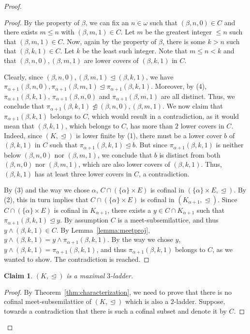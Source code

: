 \documentclass[]{amsart}
\newtheorem{claim}{Claim}[theorem]
\theoremstyle{definition}
\theoremstyle{remark}
\begin{document}
\begin{proof}
\begin{proof}
By the property of $\beta$, we can fix an $n\in\omega$ such that $(\beta, n, 0) \in C$ and there exists $m \le n$ with $(\beta, m, 1) \in C$. Let $m$ be the greatest integer $\le n$ such that $(\beta, m, 1) \in C$. Now, again by the property of $\beta$, there is some $k > n$ such that $(\beta, k, 1) \in C$. Let $k$ be the least such integer. Note that $m \le n < k$ and that $(\beta, n, 0), (\beta, m, 1)$ are lower covers of $(\beta, k, 1)$ in $C$. 

Clearly, since $(\beta, n, 0), (\beta, m, 1) \trianglelefteq (\beta, k, 1)$, we have $\pi_{\alpha+1} (\beta, n, 0), \pi_{\alpha+1} (\beta, m, 1) \trianglelefteq \pi_{\alpha+1} (\beta, k, 1)$. Moreover, by (4), $\pi_{\alpha+1} (\beta, k, 1)$, $\pi_{\alpha+1} (\beta, n, 0)$ and $\pi_{\alpha+1} (\beta, m, 1)$ are all distinct. Thus, we conclude that $\pi_{\alpha+1} (\beta, k, 1) \ntrianglelefteq (\beta, n, 0),(\beta, m, 1)$. We now claim that $\pi_{\alpha+1} (\beta, k, 1)$ belongs to $C$, which would result in a contradiction, as it would mean that $(\beta, k ,1)$, which belongs to $C$, has more than $2$ lower covers in $C$. Indeed, since $(K, \trianglelefteq)$ is lower finite by (1), there must be a lower cover $b$ of $(\beta, k, 1)$ in $C$ such that $\pi_{\alpha+1} (\beta, k, 1) \trianglelefteq b$. But since $\pi_{\alpha+1} (\beta, k, 1)$ is neither below $(\beta, n, 0)$ nor $(\beta, m, 1)$, we conclude that $b$ is distinct from both $(\beta, n, 0)$ nor $(\beta, m, 1)$, which are also lower covers of $(\beta, k, 1)$. Thus, $(\beta, k, 1)$ has at least three lower covers in $C$, a contradiction.

By (3) and the way we chose $\alpha$, $C \cap (\{\alpha\} \times E)$ is cofinal in $(\{\alpha\} \times E, \trianglelefteq)$. By (2), this in turn implies that $C \cap (\{\alpha\} \times E)$ is cofinal in $(K_{\alpha+1}, \trianglelefteq)$. 
Since $C \cap (\{\alpha\} \times E)$ is cofinal in $K_{\alpha+1}$, there exists a $y \in C \cap K_{\alpha+1}$ such that $\pi_{\alpha+1} (\beta, k, 1) \trianglelefteq y$. By assumption $C$ is a meet-subsemilattice, and thus $y \wedge (\beta, k, 1) \in C$. By Lemma~\ref{lemma:meetproj}, $y \wedge (\beta, k, 1) = y \wedge \pi_{\alpha+1}(\beta, k, 1)$. By the way we chose $y$, $y \wedge (\beta, k, 1) = \pi_{\alpha+1}(\beta, k, 1)$, and thus $\pi_{\alpha+1}(\beta, k, 1)$ belongs to $C$, as we wanted to show. The contradiction is reached.
\end{proof}

\begin{claim}\label{thm:main3:claimmaximality}
$(K, \trianglelefteq)$ is a maximal $3$-ladder.
\end{claim}
\begin{proof}
By Theorem~\ref{thm:characterization}, we need to prove that there is no cofinal meet-subsemilattice of $(K, \trianglelefteq)$ which is also a $2$-ladder. Suppose, towards a contradiction that there is such a cofinal subset and denote it by $C$. 



\end{proof}
\end{proof}
\end{document}
